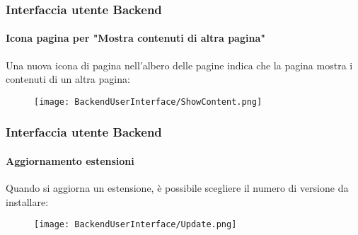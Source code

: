 \begin{frame}[fragile]
	\frametitle{Interfaccia utente Backend}
	\framesubtitle{Icona pagina per "Mostra contenuti di altra pagina"}

	Una nuova icona di pagina nell'albero delle pagine indica che la pagina mostra i contenuti di un altra pagina:

	\begin{figure}
		\texttt{[image: BackendUserInterface/ShowContent.png]}
	\end{figure}

\end{frame}

\begin{frame}[fragile]
	\frametitle{Interfaccia utente Backend}
	\framesubtitle{Aggiornamento estensioni}

	Quando si aggiorna un estensione, è possibile scegliere il numero di versione da installare:

	\begin{figure}
		\texttt{[image: BackendUserInterface/Update.png]}
	\end{figure}

\end{frame}


